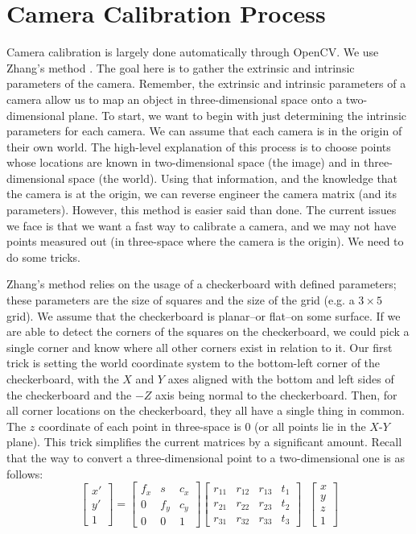\documentclass[
    12pt,
    twoside,
    bibstyle=chicago,
    headerstyle=uppercase,
	bibfile=biblatex_updating.bib
]{reedthesis}
\begin{document}
\section{Camera Calibration Process}
Camera calibration is largely done automatically through OpenCV. We use Zhang's method \autocite{zhangFlexibleNewTechnique2000a}. The goal here is to gather the extrinsic and intrinsic parameters of the camera. Remember, the extrinsic and intrinsic parameters of a camera allow us to map an object in three-dimensional space onto a two-dimensional plane. To start, we want to begin with just determining the intrinsic parameters for each camera. We can assume that each camera is in the origin of their own world. The high-level explanation of this process is to choose points whose locations are known in two-dimensional space (the image) and in three-dimensional space (the world). Using that information, and the knowledge that the camera is at the origin, we can reverse engineer the camera matrix (and its parameters). However, this method is easier said than done. The current issues we face is that we want a fast way to calibrate a camera, and we may not have points measured out (in three-space where the camera is the origin). We need to do some tricks.

Zhang's method relies on the usage of a checkerboard with defined parameters; these parameters are the size of squares and the size of the grid (e.g. a $3\times5$ grid). We assume that the checkerboard is planar--or flat--on some surface. If we are able to detect the corners of the squares on the checkerboard, we could pick a single corner and know where all other corners exist in relation to it. Our first trick is setting the world coordinate system to the bottom-left corner of the checkerboard, with the $X$ and $Y$ axes aligned with the bottom and left sides of the checkerboard and the $-Z$ axis being normal to the checkerboard. Then, for all corner locations on the checkerboard, they all have a single thing in common. The $z$ coordinate of each point in three-space is 0 (or all points lie in the $X$-$Y$ plane). This trick simplifies the current matrices by a significant amount. Recall that the way to convert a three-dimensional point to a two-dimensional one is as follows:
\[\begin{bmatrix}x' \\ y' \\ 1\end{bmatrix} = \begin{bmatrix}f_x & s & c_x \\ 0 & f_y & c_y \\ 0 & 0 & 1\end{bmatrix} \begin{bmatrix} r_{11}&r_{12}&r_{13}&t_{1}\\r_{21}&r_{22}&r_{23}&t_{2}\\r_{31}&r_{32}&r_{33}&t_{3}\end{bmatrix}\;\;\begin{bmatrix}x \\ y \\ z \\ 1\end{bmatrix}\]
\end{document}
